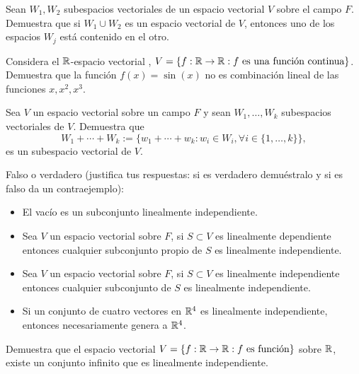 \documentclass[12pt,a4paper]{book}
\newcommand{\llaves}[1]{\{#1\}}
\newcommand{\llavesgrande}[1]{\big\{#1\big\}}
\begin{document}
    \begin{ejercicio}
        Sean $W_{1}, W_{2}$ subespacios vectoriales de un espacio vectorial $V$ sobre el campo $F$. Demuestra que si $W_{1} \cup W_{2}$ es un espacio vectorial de $V$, entonces uno de los espacios $W_{j}$ está contenido en el otro.
    \end{ejercicio}

    \begin{ejercicio}
        Considera el $\mathbb{R}$-espacio vectorial , $V = \llaves{f:\R \to \R : f \text{ es una función continua}}$. Demuestra que la función $f(x) = \sin (x)$ no es combinación lineal de las funciones $x, x^{2}, x^{3}$.
    \end{ejercicio}

    \begin{ejercicio}
        Sea $V$ un espacio vectorial sobre un campo $F$ y sean $W_{1}, \dots , W_{k}$ subespacios vectoriales de $V$. Demuestra que
        \begin{equation*}
        W_{1} + \dotsi + W_{k} := \llavesgrande{ w_{1} + \dotsi + w_{k}: w_{i} \in W_{i}, \forall i \in \{1, \dots, k \}},
        \end{equation*}
        es un subespacio vectorial de $V$.
    \end{ejercicio}

    \begin{ejercicio}
        Falso o verdadero (justifica tus respuestas: si es verdadero demuéstralo y si es falso da un contraejemplo):
        \begin{itemize}
            \item[(a)] El vacío es un subconjunto linealmente independiente.
            \item[(b)] Sea $V$ un espacio vectorial sobre $F$, si $S \subset V$ es linealmente dependiente entonces cualquier subconjunto propio de $S$ es linealmente independiente.
            \item[(c)] Sea $V$ un espacio vectorial sobre $F$, si $S \subset V$ es linealmente independiente entonces cualquier subconjunto de $S$ es linealmente independiente.
            \item[(d)] Si un conjunto de cuatro vectores en $\mathbb{R}^{4}$ es linealmente independiente, entonces necesariamente genera a $\mathbb{R}^{4}$.
        \end{itemize}
    \end{ejercicio}

    \begin{ejercicio}
        Demuestra que el espacio vectorial $V = \llaves{f: \R \to \R: f \text{ es función}}$ sobre $\mathbb{R}$, existe un conjunto infinito que es linealmente independiente.
    \end{ejercicio}
\end{document}
